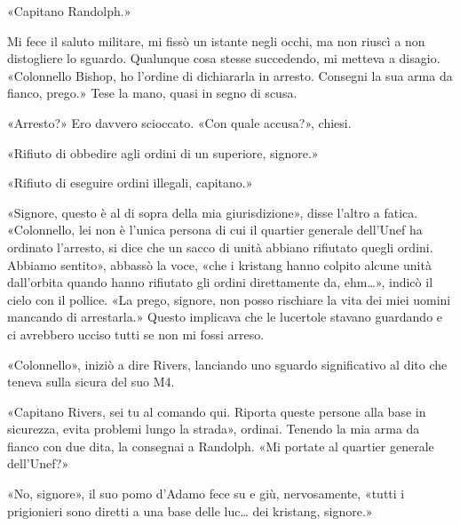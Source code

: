 «Capitano Randolph.»

Mi fece il saluto militare, mi fissò un istante negli occhi, ma non
riuscì a non distogliere lo sguardo. Qualunque cosa stesse succedendo,
mi metteva a disagio. «Colonnello Bishop, ho l'ordine di dichiararla in
arresto. Consegni la sua arma da fianco, prego.» Tese la mano, quasi in
segno di scusa.

«Arresto?» Ero davvero scioccato. «Con quale accusa?», chiesi.

«Rifiuto di obbedire agli ordini di un superiore, signore.»

«Rifiuto di eseguire ordini illegali, capitano.»

«Signore, questo è al di sopra della mia giurisdizione», disse l'altro a
fatica. «Colonnello, lei non è l'unica persona di cui il quartier
generale dell'Unef ha ordinato l'arresto, si dice che un sacco di unità
abbiano rifiutato quegli ordini. Abbiamo sentito», abbassò la voce, «che
i kristang hanno colpito alcune unità dall'orbita quando hanno rifiutato
gli ordini direttamente da, ehm\ldots», indicò il cielo con il pollice.
«La prego, signore, non posso rischiare la vita dei miei uomini mancando
di arrestarla.» Questo implicava che le lucertole stavano guardando e ci
avrebbero ucciso tutti se non mi fossi arreso.

«Colonnello», iniziò a dire Rivers, lanciando uno sguardo significativo
al dito che teneva sulla sicura del suo M4.

«Capitano Rivers, sei tu al comando qui. Riporta queste persone alla
base in sicurezza, evita problemi lungo la strada», ordinai. Tenendo la
mia arma da fianco con due dita, la consegnai a Randolph. «Mi portate al
quartier generale dell'Unef?»

«No, signore», il suo pomo d'Adamo fece su e giù, nervosamente, «tutti i
prigionieri sono diretti a una base delle luc\ldots{} dei kristang,
signore.»